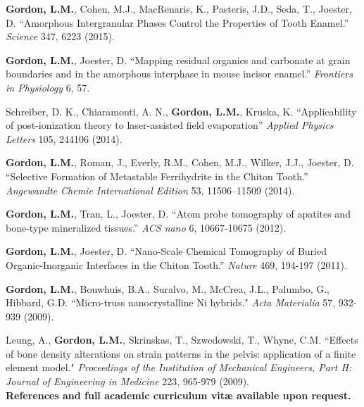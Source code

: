 \textbf{Gordon, L.M.}, Cohen, M.J., MacRenaris, K., Pasteris, J.D., Seda, T., Joester, D. “Amorphous Intergranular Phases Control the Properties of Tooth Enamel.” \emph{Science} 347, 6223 (2015).

\textbf{Gordon, L.M.}, Joester, D. “Mapping residual organics and carbonate at grain boundaries and in the amorphous interphase in mouse incisor enamel.” \emph{Frontiers in Physiology} 6, 57. 

Schreiber, D. K., Chiaramonti, A. N., \textbf{Gordon, L.M.}, Kruska, K. “Applicability of post-ionization theory to laser-assisted field evaporation” \emph{Applied Physics Letters} 105, 244106 (2014). 

\textbf{Gordon, L.M.}, Roman, J., Everly, R.M., Cohen, M.J., Wilker, J.J., Joester, D. “Selective Formation of Metastable Ferrihydrite in the Chiton Tooth.” \emph{Angewandte Chemie International Edition} 53, 11506–11509 (2014). 

\textbf{Gordon, L.M.}, Tran, L., Joester, D. “Atom probe tomography of apatites and bone-type mineralized tissues.” \emph{ACS nano} 6, 10667-10675 (2012).

\textbf{Gordon, L.M.}, Joester, D. “Nano-Scale Chemical Tomography of Buried Organic-Inorganic Interfaces in the Chiton Tooth.” \emph{Nature} 469, 194-197 (2011). 

\textbf{Gordon, L.M.}, Bouwhuis, B.A., Suralvo, M., McCrea, J.L., Palumbo, G., Hibbard, G.D. ``Micro-truss nanocrystalline Ni hybrids." \emph{Acta Materialia} 57, 932-939 (2009). 

Leung, A., \textbf{Gordon, L.M.}, Skrinskas, T., Szwedowski, T., Whyne, C.M. ``Effects of bone density alterations on strain patterns in the pelvis: application of a finite element model." \emph{Proceedings of the Institution of Mechanical Engineers, Part H: Journal of Engineering in Medicine} 223, 965-979 (2009). 
\endgroup\\[0.1cm]

\textbf{References and full academic curriculum vitæ available upon request.}
